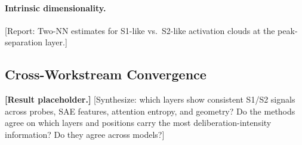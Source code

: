 \paragraph{Intrinsic dimensionality.}  [Report: Two-NN estimates for S1-like
vs.\ S2-like activation clouds at the peak-separation layer.]

\subsection{Cross-Workstream Convergence}
\label{sec:results_convergence}

\textbf{[Result placeholder.]}  [Synthesize: which layers show consistent
S1/S2 signals across probes, SAE features, attention entropy, and geometry?
Do the methods agree on which layers and positions carry the most
deliberation-intensity information?  Do they agree across models?]
